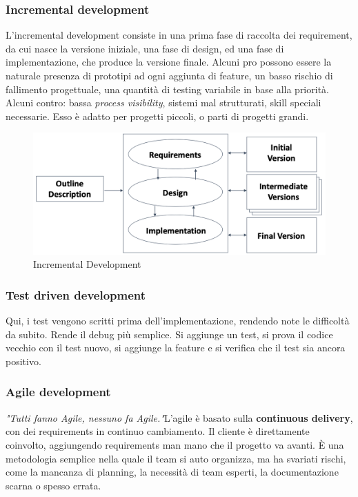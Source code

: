\documentclass[11pt]{article}
\begin{document}
\subsubsection{Incremental development}
L'incremental development consiste in una prima fase di raccolta dei requirement, da cui nasce la versione iniziale, una fase di design, ed una fase di implementazione, che produce la versione finale. Alcuni pro possono essere la naturale presenza di prototipi ad ogni aggiunta di feature, un basso rischio di fallimento progettuale, una quantità di testing variabile in base alla priorità. Alcuni contro: bassa \textit{process visibility}, sistemi mal strutturati, skill speciali necessarie. Esso è adatto per progetti piccoli, o parti di progetti grandi. 
\begin{figure}[H]
    \centering
    \includegraphics[width=\linewidth]{res/teoria/IncrementalDevelopment.png}
    \caption{Incremental Development}
\end{figure}
\subsubsection{Test driven development}
Qui, i test vengono scritti prima dell'implementazione, rendendo note le difficoltà da subito. Rende il debug più semplice. Si aggiunge un test, si prova il codice vecchio con il test nuovo, si aggiunge la feature e si verifica che il test sia ancora positivo. 
\subsubsection{Agile development}
\textit{"Tutti fanno Agile, nessuno fa Agile."}L'agile è basato sulla \textbf{continuous delivery}, con dei requirements in continuo cambiamento. Il cliente è direttamente coinvolto, aggiungendo requirements man mano che il progetto va avanti. È una metodologia semplice nella quale il team si auto organizza, ma ha svariati rischi, come la mancanza di planning, la necessità di team esperti, la documentazione scarna o spesso errata. 
\end{document}
